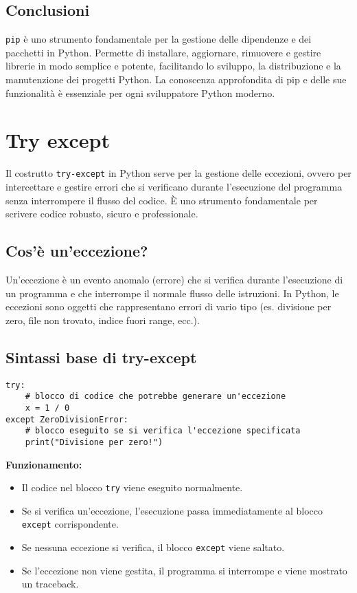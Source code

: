 \documentclass[a4paper,12pt]{article}
\begin{document}
\subsection*{Conclusioni}
\texttt{pip} è uno strumento fondamentale per la gestione delle dipendenze e dei pacchetti in Python. Permette di installare, aggiornare, rimuovere e gestire librerie in modo semplice e potente, facilitando lo sviluppo, la distribuzione e la manutenzione dei progetti Python. La conoscenza approfondita di pip e delle sue funzionalità è essenziale per ogni sviluppatore Python moderno.

\section{Try except}
Il costrutto \texttt{try-except} in Python serve per la gestione delle eccezioni, ovvero per intercettare e gestire errori che si verificano durante l'esecuzione del programma senza interrompere il flusso del codice. È uno strumento fondamentale per scrivere codice robusto, sicuro e professionale.

\subsection*{Cos'è un'eccezione?}
Un'eccezione è un evento anomalo (errore) che si verifica durante l'esecuzione di un programma e che interrompe il normale flusso delle istruzioni. In Python, le eccezioni sono oggetti che rappresentano errori di vario tipo (es. divisione per zero, file non trovato, indice fuori range, ecc.).

\subsection*{Sintassi base di try-except}
\begin{lstlisting}
try:
    # blocco di codice che potrebbe generare un'eccezione
    x = 1 / 0
except ZeroDivisionError:
    # blocco eseguito se si verifica l'eccezione specificata
    print("Divisione per zero!")
\end{lstlisting}

\textbf{Funzionamento:}
\begin{itemize}
    \item Il codice nel blocco \texttt{try} viene eseguito normalmente.
    \item Se si verifica un'eccezione, l'esecuzione passa immediatamente al blocco \texttt{except} corrispondente.
    \item Se nessuna eccezione si verifica, il blocco \texttt{except} viene saltato.
    \item Se l'eccezione non viene gestita, il programma si interrompe e viene mostrato un traceback.
\end{itemize}
\end{document}
